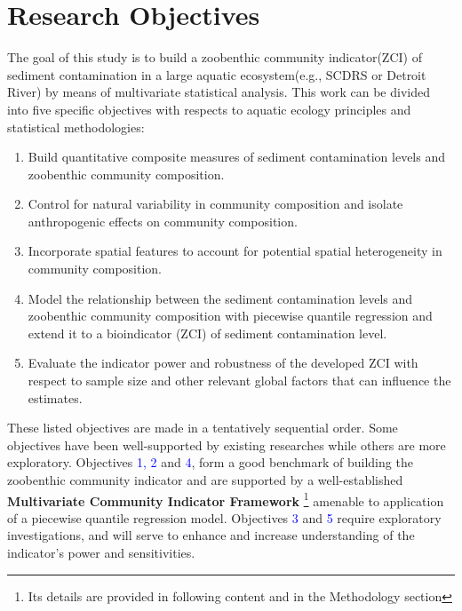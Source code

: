 \section{Research Objectives}

The goal of this study is to build a zoobenthic community indicator(ZCI) of sediment contamination 
in a large aquatic ecosystem(e.g., SCDRS or Detroit River) by means of multivariate statistical analysis.
This work can be divided into five specific objectives with respects to aquatic ecology principles and
statistical methodologies:

\begin{enumerate}
    \item Build quantitative composite measures of sediment contamination levels and zoobenthic community composition.
        \item Control for natural variability in community composition and isolate anthropogenic effects on community composition.
        \item Incorporate spatial features to account for potential spatial heterogeneity in community composition.
        \item Model the relationship between the sediment contamination levels and zoobenthic community composition
        with piecewise quantile regression and extend it to a bioindicator (ZCI) of sediment contamination level.
        \item Evaluate the indicator power and robustness of the developed ZCI with respect
        to sample size and other relevant global factors that can influence the estimates.
\end{enumerate}

These listed objectives are made in a tentatively sequential order. Some objectives have been well-supported by
existing researches while others are more exploratory. Objectives \textcolor{blue}{1, 2} and \textcolor{blue}{4},
form a good benchmark of building the zoobenthic community indicator and are supported by a well-established
\textbf{Multivariate Community Indicator Framework}
\footnote{Its details are provided in following content and in the Methodology section}
\cite{Brazner2007, Kovalenko2014, Host2019, Ciborowski2005ZoobenthicIndicators,Zhang2008}
amenable to application of a piecewise quantile regression model.
Objectives \textcolor{blue}{3} and \textcolor{blue}{5} require exploratory investigations, 
and will serve to enhance and increase understanding of the indicator's power and sensitivities.

